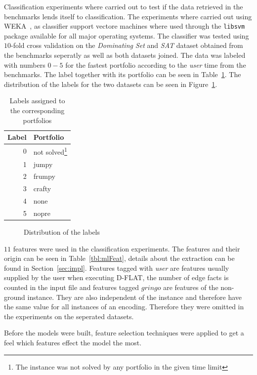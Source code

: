 Classification experiments where carried out to test if the data retrieved in the benchmarks lends itself to classification. The experiments where carried out using WEKA~\cite{WEKA}, as classifier support vectore machines where used through the \lstinline$libsvm$ package available for all major operating systems. The classifier was tested using $10$-fold cross validation on the \emph{Dominating Set} and \emph{SAT} dataset obtained from the benchmarks seperatly as well as both datasets joined. The data was labeled with numbers $0-5$ for the fastest portfolio according to the \emph{user} time from the benchmarks. The label together with its portfolio can be seen in Table~\ref{tbl:mlLabel}. The distribution of the labels for the two datasets can be seen in Figure~\ref{fig:mlDistr}.
\begin{table}[h]
	\center
	\begin{tabular}{|r|l|}
		\hline
		Label & Portfolio\\
		\hline
		0 & not solved\footnote{The instance was not solved by any portfolio in the given time limit} \\
		1 & jumpy\\
		2 & frumpy\\
		3 & crafty\\
		4 & none \\
		5 & nopre\\
		\hline
	\end{tabular}
	\caption{Labels assigned to the corresponding portfolios}
	\label{tbl:mlLabel}
\end{table}

\begin{figure}[h]
	\caption{Distribution of the labels\label{fig:mlDistr}}
\end{figure}

\par $11$ features were used in the classification experiments. The features and their origin can be seen in Table~\ref{tbl:mlFeat}, details about the extraction can be found in Section~\ref{sec:impl}. Features tagged with \emph{user} are features usually supplied by the user when executing D-FLAT, the number of edge facts is counted in the input file and features tagged $gringo$ are features of the non-ground instance. They are also independent of the instance and therefore have the same value for all instances of an encoding. Therefore they were omitted in the experiments on the seperated datasets.

Before the models were built, feature selection techniques were applied to get a feel which features effect the model the most.

